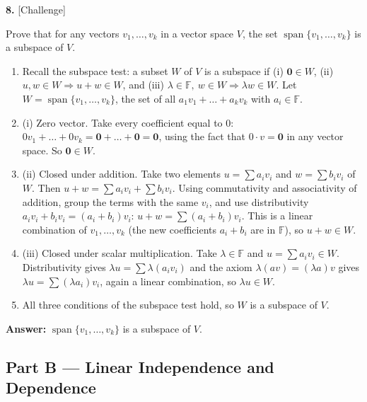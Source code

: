 \documentclass[11pt]{article}
\begin{document}
\par\vspace{2pt}
\begin{minipage}{\linewidth}\textbf{8.} \hfill{\scriptsize\color{ink}[Challenge]}\par\nopagebreak Prove that for any vectors $v_1,\dots,v_k$ in a vector space $V$, the set $\operatorname{span}\{v_1,\dots,v_k\}$ is a subspace of $V$.
\end{minipage}\par\nopagebreak
\begin{tcolorbox}[breakable,colback=ans,colframe=ansb,boxrule=0.5pt,left=4pt,right=4pt,top=2pt,bottom=2pt]\begin{enumerate}[leftmargin=2.2em,itemsep=1pt,topsep=1pt,label=\textbf{Step \arabic*.}]\item Recall the subspace test: a subset $W$ of $V$ is a subspace if (i) $\mathbf 0\in W$, (ii) $u,w\in W\Rightarrow u+w\in W$, and (iii) $\lambda\in\mathbb{F},\ w\in W\Rightarrow\lambda w\in W$. Let $W=\operatorname{span}\{v_1,\dots,v_k\}$, the set of all $a_1v_1+\dots+a_kv_k$ with $a_i\in\mathbb{F}$.
\item (i) Zero vector. Take every coefficient equal to $0$: $0v_1+\dots+0v_k=\mathbf 0+\dots+\mathbf 0=\mathbf 0$, using the fact that $0\cdot v=\mathbf 0$ in any vector space. So $\mathbf 0\in W$.
\item (ii) Closed under addition. Take two elements $u=\sum a_iv_i$ and $w=\sum b_iv_i$ of $W$. Then $u+w=\sum a_iv_i+\sum b_iv_i$. Using commutativity and associativity of addition, group the terms with the same $v_i$, and use distributivity $a_iv_i+b_iv_i=(a_i+b_i)v_i$: $u+w=\sum(a_i+b_i)v_i$. This is a linear combination of $v_1,\dots,v_k$ (the new coefficients $a_i+b_i$ are in $\mathbb{F}$), so $u+w\in W$.
\item (iii) Closed under scalar multiplication. Take $\lambda\in\mathbb{F}$ and $u=\sum a_iv_i\in W$. Distributivity gives $\lambda u=\sum\lambda(a_iv_i)$ and the axiom $\lambda(av)=(\lambda a)v$ gives $\lambda u=\sum(\lambda a_i)v_i$, again a linear combination, so $\lambda u\in W$.
\item All three conditions of the subspace test hold, so $W$ is a subspace of $V$.
\end{enumerate}\textbf{Answer:} $\operatorname{span}\{v_1,\dots,v_k\}$ is a subspace of $V$.\end{tcolorbox}
\par\vspace{2pt}
\subsection*{\normalsize\color{ink} Part B --- Linear Independence and Dependence}
\end{document}
